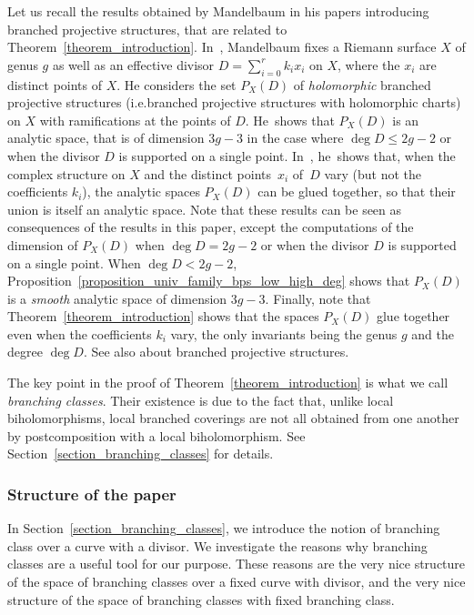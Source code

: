 \documentclass[10pt]{amsart}
\newcommand{\ie}{i.e.}
\theoremstyle{definition}
\theoremstyle{plain}
\begin{document}
Let us recall the results obtained by Mandelbaum in his papers introducing branched projective structures, that are related to Theorem~\ref{theorem_introduction}. In~\cite{mandelbaum_1}, Mandelbaum fixes a Riemann surface $X$ of genus $g$ as well as an effective divisor $D = \sum_{i=0}^r k_i x_i$ on $X$, where the $x_i$ are distinct points of $X$.
He considers the set $P_X(D)$ of \emph{holomorphic} branched projective structures (\ie branched projective structures with holomorphic charts) on $X$ with ramifications at the points of $D$.
He~shows that $P_X(D)$ is an analytic space, that is of dimension $3g-3$ in the case where $\deg D \le 2g-2$ or when the divisor $D$ is supported on a single point.
In~\cite{mandelbaum_2}, he~shows that, when the complex structure on $X$ and the distinct points~$x_i$ of~$D$ vary (but not the coefficients $k_i$), the analytic spaces $P_X(D)$ can be glued together, so that their union is itself an analytic space.
Note that these results can be seen as consequences of the results in this paper, except the computations of the dimension of $P_X(D)$ when $\deg D = 2g-2$ or when the divisor $D$ is supported on a single point.
When $\deg D < 2g-2$, Proposition~\ref{proposition_univ_family_bps_low_high_deg} shows that $P_X(D)$ is a \emph{smooth} analytic space of dimension $3g-3$.
Finally, note that Theorem~\ref{theorem_introduction} shows that the spaces $P_X(D)$ glue together even when the coefficients $k_i$ vary, the only invariants being the genus $g$ and the degree $\deg D$.
See also \cite{mandelbaum_3} about branched projective structures.

The key point in the proof of Theorem~\ref{theorem_introduction} is what we call \emph{branching classes}.
Their existence is due to the fact that, unlike local biholomorphisms, local branched coverings are not all obtained from one another by postcomposition with a local biholomorphism.
See Section~\ref{section_branching_classes} for details.\enlargethispage{\baselineskip}%

\subsubsection*{Structure of the paper}

In Section~\ref{section_branching_classes}, we introduce the notion of branching class over a curve with a divisor.
We investigate the reasons why branching classes are a useful tool for our purpose.
These reasons are the very nice structure of the space of branching classes over a fixed curve with divisor, and the very nice structure of the space of branching classes with fixed branching class.
\end{document}
